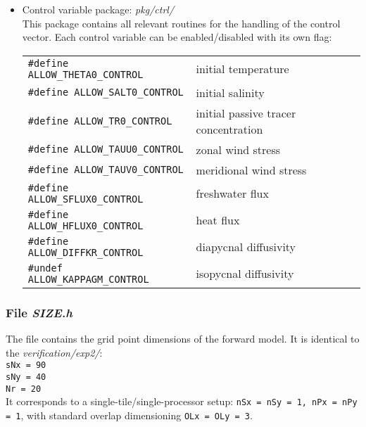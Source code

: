 \begin{itemize}
in particular the hooks in the forward code for
initializing, accumulating and finalizing the cost function. \\
\hspace*{4ex} {\tt \#define ALLOW\_COST\_TRACER} \\
includes the call to the cost function for this
particular experiment, eqn. (\ref{cost_tracer}).
%
\item Control variable package: {\it pkg/ctrl/} \\
This package contains all relevant routines for
the handling of the control vector.
Each control variable can be enabled/disabled with its own flag: \\
\begin{tabular}{ll}
\hspace*{2ex} {\tt \#define ALLOW\_THETA0\_CONTROL} & 
initial temperature \\
\hspace*{2ex} {\tt \#define ALLOW\_SALT0\_CONTROL} & 
initial salinity \\
\hspace*{2ex} {\tt \#define ALLOW\_TR0\_CONTROL} & 
initial passive tracer concentration \\
\hspace*{2ex} {\tt \#define ALLOW\_TAUU0\_CONTROL} & 
zonal wind stress \\
\hspace*{2ex} {\tt \#define ALLOW\_TAUV0\_CONTROL} & 
meridional wind stress \\
\hspace*{2ex} {\tt \#define ALLOW\_SFLUX0\_CONTROL} & 
freshwater flux \\
\hspace*{2ex} {\tt \#define ALLOW\_HFLUX0\_CONTROL} & 
heat flux \\
\hspace*{2ex} {\tt \#define ALLOW\_DIFFKR\_CONTROL} & 
diapycnal diffusivity \\
\hspace*{2ex} {\tt \#undef ALLOW\_KAPPAGM\_CONTROL} & 
isopycnal diffusivity \\
\end{tabular}
%
\end{itemize}

\subsubsection{File {\it SIZE.h}}
\label{www:tutorials}

The file contains the grid point dimensions of the forward
model. It is identical to the {\it verification/exp2/}: \\
\hspace*{4ex} {\tt sNx = 90} \\
\hspace*{4ex} {\tt sNy = 40} \\
\hspace*{4ex} {\tt Nr = 20} \\
It corresponds to a single-tile/single-processor setup:
{\tt nSx = nSy = 1, nPx = nPy = 1},
with standard overlap dimensioning
{\tt OLx = OLy = 3}.

